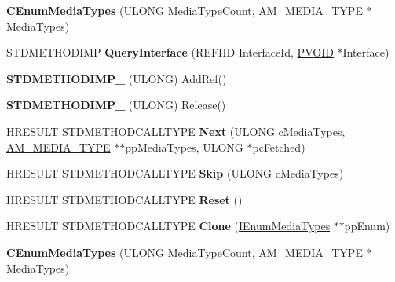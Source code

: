 \begin{DoxyCompactItemize}
{\bfseries C\+Enum\+Media\+Types} (U\+L\+O\+NG Media\+Type\+Count, \hyperlink{struct_a_m___m_e_d_i_a___t_y_p_e}{A\+M\+\_\+\+M\+E\+D\+I\+A\+\_\+\+T\+Y\+PE} $\ast$Media\+Types)
\item 
\mbox{\label{class_c_enum_media_types_a2d2f0e2419e7bf6450ac2051030c71d9}} 
S\+T\+D\+M\+E\+T\+H\+O\+D\+I\+MP {\bfseries Query\+Interface} (R\+E\+F\+I\+ID Interface\+Id, \hyperlink{interfacevoid}{P\+V\+O\+ID} $\ast$Interface)
\item 
\mbox{\label{class_c_enum_media_types_af0f88e544323168a44c5067a4148697f}} 
{\bfseries S\+T\+D\+M\+E\+T\+H\+O\+D\+I\+M\+P\+\_\+} (U\+L\+O\+NG) Add\+Ref()
\item 
\mbox{\label{class_c_enum_media_types_a214edb37be309bc87a48223847bb4bfb}} 
{\bfseries S\+T\+D\+M\+E\+T\+H\+O\+D\+I\+M\+P\+\_\+} (U\+L\+O\+NG) Release()
\item 
\mbox{\label{class_c_enum_media_types_a0ce2ac1725e2f768b5fdddefbada523b}} 
H\+R\+E\+S\+U\+LT S\+T\+D\+M\+E\+T\+H\+O\+D\+C\+A\+L\+L\+T\+Y\+PE {\bfseries Next} (U\+L\+O\+NG c\+Media\+Types, \hyperlink{struct_a_m___m_e_d_i_a___t_y_p_e}{A\+M\+\_\+\+M\+E\+D\+I\+A\+\_\+\+T\+Y\+PE} $\ast$$\ast$pp\+Media\+Types, U\+L\+O\+NG $\ast$pc\+Fetched)
\item 
\mbox{\label{class_c_enum_media_types_a0848341e563110af55130655ad4ddde2}} 
H\+R\+E\+S\+U\+LT S\+T\+D\+M\+E\+T\+H\+O\+D\+C\+A\+L\+L\+T\+Y\+PE {\bfseries Skip} (U\+L\+O\+NG c\+Media\+Types)
\item 
\mbox{\label{class_c_enum_media_types_a4f23fa609e66a6061f97226a824c7090}} 
H\+R\+E\+S\+U\+LT S\+T\+D\+M\+E\+T\+H\+O\+D\+C\+A\+L\+L\+T\+Y\+PE {\bfseries Reset} ()
\item 
\mbox{\label{class_c_enum_media_types_a19a6dde16432acd6d05abf7156538233}} 
H\+R\+E\+S\+U\+LT S\+T\+D\+M\+E\+T\+H\+O\+D\+C\+A\+L\+L\+T\+Y\+PE {\bfseries Clone} (\hyperlink{interface_i_enum_media_types}{I\+Enum\+Media\+Types} $\ast$$\ast$pp\+Enum)
\item 
\mbox{\label{class_c_enum_media_types_a845104868b04e49f9bba9a328288cf82}} 
{\bfseries C\+Enum\+Media\+Types} (U\+L\+O\+NG Media\+Type\+Count, \hyperlink{struct_a_m___m_e_d_i_a___t_y_p_e}{A\+M\+\_\+\+M\+E\+D\+I\+A\+\_\+\+T\+Y\+PE} $\ast$Media\+Types)
\end{DoxyCompactItemize}
